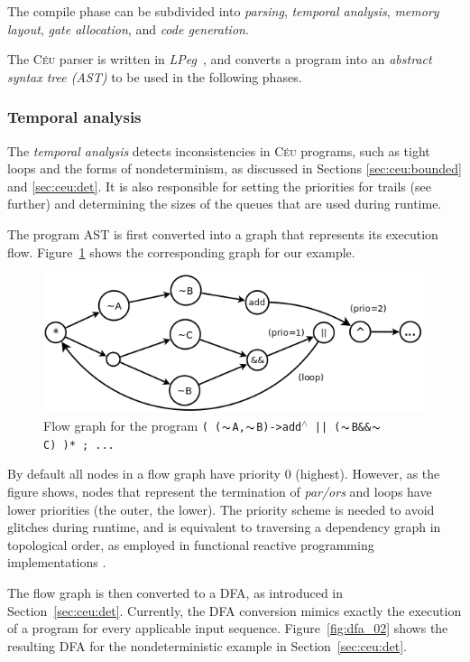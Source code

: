 \documentclass{sig-alternate-ipsn09}
\newcommand{\2}{\;\;}
\newcommand{\5}{\;\;\;\;\;}
\newcommand{\til}{$\thicksim$}
\newcommand{\brk}{\textbf{\small{$^\wedge$}}}
\newcommand{\CEU}{\textsc{C\'{e}u}}
\newcommand{\code}[1] {{\small{\texttt{#1}}}}
\begin{document}
The compile phase can be subdivided into \emph{parsing}, \emph{temporal 
analysis}, \emph{memory layout}, \emph{gate allocation}, and \emph{code 
generation}.

The \CEU{} parser is written in \emph{LPeg}~\cite{lua.lpeg}, and converts a 
program into an \emph{abstract syntax tree (AST)} to be used in the following 
phases.

\subsubsection{Temporal analysis}

The \emph{temporal analysis} detects inconsistencies in \CEU{} programs, such 
as tight loops and the forms of nondeterminism, as discussed in Sections 
\ref{sec:ceu:bounded} and \ref{sec:ceu:det}.
It is also responsible for setting the priorities for trails (see further) and 
determining the sizes of the queues that are used during runtime.

The program AST is first converted into a graph that represents its execution 
flow.
Figure~\ref{fig:nfa} shows the corresponding graph for our example.

\begin{figure}[ht]
\centering
\caption{ Flow graph for the program \2\2
    \code{(~(\til{}A,\til{}B)->add\brk{}~||~(\til{}B\&\&\til{}C)~)*~;~...}
}
\label{fig:nfa}
\includegraphics[scale=0.30]{nfa.png}
\end{figure}

By default all nodes in a flow graph have priority $0$ (highest).
However, as the figure shows, nodes that represent the termination of 
\emph{par/ors} and loops have lower priorities (the outer, the lower).
The priority scheme is needed to avoid glitches during runtime, and is 
equivalent to traversing a dependency graph in topological order, as employed 
in functional reactive programming implementations \cite{frtime.embedding}.

The flow graph is then converted to a DFA, as introduced in 
Section~\ref{sec:ceu:det}.
Currently, the DFA conversion mimics exactly the execution of a program for 
every applicable input sequence.
Figure~\ref{fig:dfa_02} shows the resulting DFA for the nondeterministic 
example in Section~\ref{sec:ceu:det}.
\end{document}
